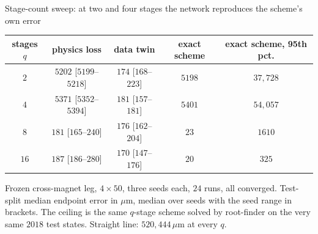 \documentclass[aspectratio=169,10pt]{beamer}
\newcommand{\um}{\ensuremath{\,\mu\mathrm{m}}}
\newcommand{\hl}[1]{{\color{accent}\textbf{#1}}}
\begin{document}
\begin{frame}[shrink=25]{Stage-count sweep: at two and four stages the network reproduces the scheme's own error}
  \vspace{2mm}
  \centering\small
  \begin{tabular}{@{}ccccc@{}}
    \toprule
    stages $q$ & physics loss & data twin & exact scheme & exact scheme, 95th pct.\\
    \midrule
    $2$  & \hl{$5202$} [$5199$--$5218$] & $174$ [$168$--$223$] & \hl{$5198$} & $37{,}728$ \\
    $4$  & \hl{$5371$} [$5352$--$5394$] & $181$ [$157$--$181$] & \hl{$5401$} & $54{,}057$ \\
    $8$  & $181$ [$165$--$240$]         & $176$ [$162$--$204$] & $23$   & $1610$ \\
    $16$ & $187$ [$186$--$280$]         & $170$ [$147$--$176$] & $20$   & $325$ \\
    \bottomrule
  \end{tabular}
  \vspace{1mm}

  {\scriptsize Frozen cross-magnet leg, $4\times50$, three seeds each, $24$ runs,
   all converged. Test-split median endpoint error in $\mu$m, median over seeds
   with the seed range in brackets. The ceiling is the same $q$-stage scheme
   solved by root-finder on the very same $2018$ test states. Straight line:
   $520{,}444\um$ at every $q$.}
  \vspace{3mm}


\end{frame}
\end{document}
